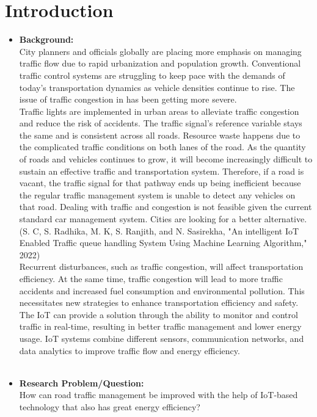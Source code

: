 \documentclass[12pt,a4paper]{article}
\begin{document}
\section{Introduction}
\begin{itemize}
    \item \textbf{Background:}\\
    City planners and officials globally are placing more emphasis on managing traffic flow due to rapid urbanization and population growth. Conventional traffic control systems are struggling to keep pace with the demands of today's transportation dynamics as vehicle densities continue to rise. The issue of traffic congestion in has been getting more severe.\\

Traffic lights are implemented in urban areas to alleviate traffic congestion and reduce the risk of accidents. The traffic signal's reference variable stays the same and is consistent across all roads. Resource waste happens due to the complicated traffic conditions on both lanes of the road. As the quantity of roads and vehicles continues to grow, it will become increasingly difficult to sustain an effective traffic and transportation system. Therefore, if a road is vacant, the traffic signal for that pathway ends up being inefficient because the regular traffic management system is unable to detect any vehicles on that road. Dealing with traffic and congestion is not feasible given the current standard car management system. Cities are looking for a better alternative. (S. C, S. Radhika, M. K, S. Ranjith, and N. Sasirekha, "An intelligent IoT Enabled Traffic queue handling System Using Machine Learning Algorithm," 2022)\\

Recurrent disturbances, such as traffic congestion, will affect transportation efficiency. At the same time, traffic congestion will lead to more traffic accidents and increased fuel consumption and environmental pollution. This necessitates new strategies to enhance transportation efficiency and safety. The IoT can provide a solution through the ability to monitor and control traffic in real-time, resulting in better traffic management and lower energy usage. IoT systems combine different sensors, communication networks, and data analytics to improve traffic flow and energy efficiency.\\
\\

    \item \textbf{Research Problem/Question:}\\
    How can road traffic management be improved with the help of IoT-based technology that also has great energy efficiency?\\


\end{itemize}
\end{document}
